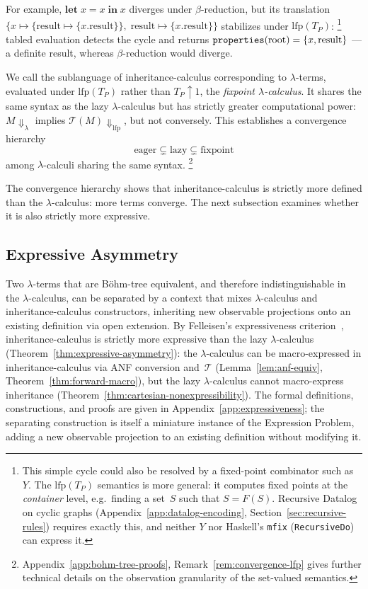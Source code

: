 For example,
$\mathbf{let}\; x = x \;\mathbf{in}\; x$
diverges under $\beta$-reduction, but its translation
$\{x \mapsto \{\mathrm{result} \mapsto \{x.\mathrm{result}\}\},\;
\mathrm{result} \mapsto \{x.\mathrm{result}\}\}$
stabilizes under $\mathrm{lfp}(T_P)$:%
\footnote{
  This simple cycle could also be resolved by a
  fixed-point combinator such as~$Y$.
  The $\mathrm{lfp}(T_P)$ semantics is more general:
  it computes fixed points at the \emph{container} level,
  e.g.\ finding a set~$S$ such that $S = F(S)$.
  Recursive Datalog on cyclic graphs
  (Appendix~\ref{app:datalog-encoding},
  Section~\ref{sec:recursive-rules}) requires exactly this,
  and neither $Y$ nor Haskell's \texttt{mfix}
  (\texttt{RecursiveDo}) can express it.
}
tabled evaluation detects the cycle and returns
$\mathtt{properties}(\mathrm{root}) = \{x, \mathrm{result}\}$
---a definite result,
whereas $\beta$-reduction would diverge.

We call the sublanguage of inheritance-calculus corresponding
to $\lambda$-terms, evaluated under $\mathrm{lfp}(T_P)$ rather than
$T_P\!\uparrow\!1$, the \emph{fixpoint $\lambda$-calculus}.
It shares the same syntax as the lazy $\lambda$-calculus but
has strictly greater computational power:
$M{\Downarrow}_\lambda$ implies
$\mathcal{T}(M){\Downarrow}_{\mathrm{lfp}}$,
but not conversely.
This establishes a convergence hierarchy
\[
  \text{eager} \subsetneq \text{lazy} \subsetneq \text{fixpoint}
\]
among $\lambda$-calculi sharing the same syntax.%
\footnote{
  Appendix~\ref{app:bohm-tree-proofs},
  Remark~\ref{rem:convergence-lfp} gives further
  technical details on the observation granularity
  of the set-valued semantics.
}

The convergence hierarchy shows that
inheritance-calculus is strictly more defined than the
$\lambda$-calculus: more terms converge.
The next subsection examines whether it is also strictly
more expressive.

\subsection{Expressive Asymmetry}
\label{sec:asymmetry}
\label{sec:formal-separation}
Two $\lambda$-terms that are B\"ohm-tree equivalent,
and therefore indistinguishable in the $\lambda$-calculus,
can be
separated by a context that mixes $\lambda$-calculus and
inheritance-calculus constructors, inheriting new observable
projections onto an existing definition via open extension.
By Felleisen's expressiveness
criterion~\cite{felleisen1991-expressive-power}, inheritance-calculus is
strictly more expressive than the lazy $\lambda$-calculus
(Theorem~\ref{thm:expressive-asymmetry}):
the $\lambda$-calculus can be macro-expressed in
inheritance-calculus via ANF conversion
and~$\mathcal{T}$
(Lemma~\ref{lem:anf-equiv}, Theorem~\ref{thm:forward-macro}),
but the lazy $\lambda$-calculus cannot macro-express inheritance
(Theorem~\ref{thm:cartesian-nonexpressibility}).
The formal definitions, constructions, and proofs are given in
Appendix~\ref{app:expressiveness};
the separating construction is itself a miniature instance of
the Expression Problem, adding a new observable projection to
an existing definition without modifying it.

